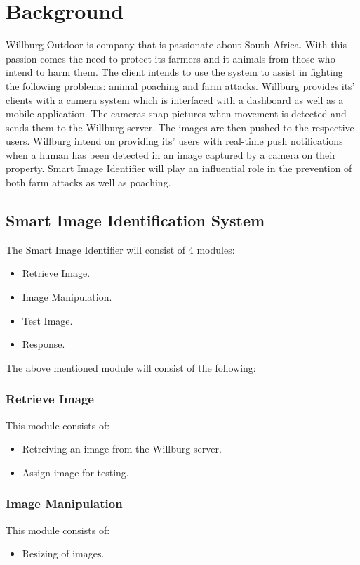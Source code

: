 \documentclass[a4paper,12pt]{report}
\begin{document}
\renewcommand{\thesection}{\arabic{section}}
\tableofcontents
\newpage

\section {Background} \hfill \break
Willburg Outdoor is company that is passionate about South Africa. With this passion comes the need to protect its farmers and it animals from those who intend to harm them. The client intends to use the system to assist in fighting the following problems: animal poaching and farm attacks. 
Willburg provides its' clients with a camera system which is interfaced with a dashboard as well as a mobile application. The cameras snap pictures when movement is detected and sends them to the Willburg server. The images are then pushed to the respective users. Willburg intend on providing its' users with real-time push notifications when a human has been detected in an image captured by a camera on their property. Smart Image Identifier will play an influential role in the prevention of both farm attacks as well as poaching.

\subsection {Smart Image Identification System}
The Smart Image Identifier will consist of 4 modules:
	\begin {itemize}
		\item Retrieve Image.  
		\item Image Manipulation.
		\item Test Image.
		\item Response.
	\end {itemize}

The above mentioned module will consist of the following:
	\subsubsection {Retrieve Image}
		This module consists of:
			\begin {itemize}
				\item Retreiving an image from the Willburg server.
				\item Assign image for testing. 
			\end {itemize}

	\subsubsection {Image Manipulation}
		This module consists of:
			\begin {itemize}
				\item Resizing of images.
			\end {itemize}
\end{document}
